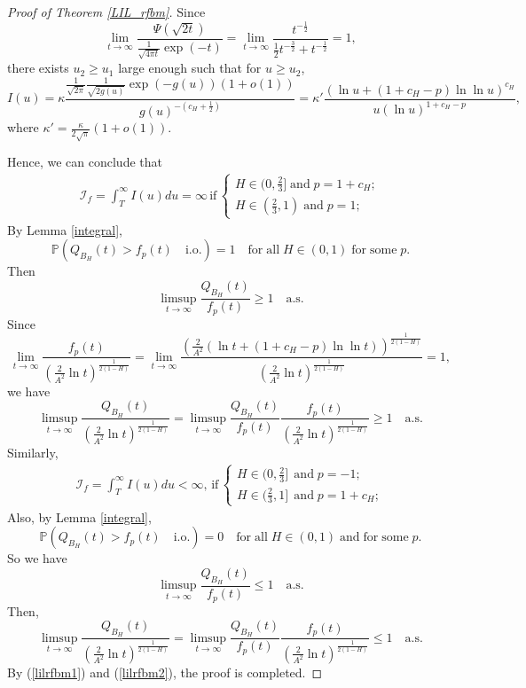 \documentclass[main.tex]{subfiles}
\begin{document}
\begin{proof}[Proof of Theorem \ref{LIL_rfbm}]
Since
$$\lim\limits_{t\to\infty}\frac{\Psi\left(\sqrt{2t}\right)}{\frac{1}{\sqrt{4\pi t}}\exp(-t)}=\lim\limits_{t\to\infty}\frac{t^{-\frac{1}{2}}}{\frac{1}{2}t^{-\frac{3}{2}}+t^{-\frac{1}{2}}}=1,$$
there exists $u_2\geqslant u_1$ large enough such that for $u\geqslant u_2$,
$$I(u)=\kappa\frac{\frac{1}{\sqrt{2\pi}}\frac{1}{\sqrt{2g(u)}}\exp(-g(u))\left(1+o(1)\right)}{g(u)^{-(c_H+\frac{1}{2})}}=\kappa'\frac{\left(\ln{u}+(1+c_H-p)\ln{\ln{u}}\right)^{c_H}}{u(\ln{u})^{1+c_H-p}},$$
where $\kappa'=\frac{\kappa}{2\sqrt{\pi}}(1+o(1))$.

Hence, we can conclude that
\begin{align*}
	\mathcal{I}_f=\int^\infty_TI(u)du=\infty\,\mathrm{if}\,
	\left\{
		\begin{array}{lr}
			H\in(0,\frac{2}{3}]\;\mathrm{and}\;p = 1+c_H;\\
			H\in(\frac{2}{3},1)\;\mathrm{and}\;p = 1;
		\end{array}
	\right.
\end{align*}
By Lemma \ref{integral},
$$\mathbb{P}\left(Q_{B_{H}}(t)>f_p(t)\quad\mathrm{i.o.}\right)=1\quad\mathrm{for\;all\;}H\in(0,1)\mathrm{\;for\;some\;}p.$$
Then 
$$\limsup\limits_{t\to\infty}\frac{Q_{B_{H}}(t)}{f_p(t)}\geqslant1\quad\mathrm{a.s.}$$
Since
$$\lim_{t\to\infty}\frac{f_p(t)}{(\frac{2}{A^{2}}\ln t)^{\frac{1}{2(1-H)}}}=\lim_{t\to\infty}\frac{\left(\frac{2}{A^{2}}(\ln{t} + (1+c_H-p)\ln{\ln{t}})\right)^{\frac{1}{2(1-H)}}}{(\frac{2}{A^{2}}\ln t)^{\frac{1}{2(1-H)}}}=1,$$
we have
\begin{equation}
\label{lilrfbm1}
	\limsup\limits_{t\to\infty}\frac{Q_{B_H}(t)}{(\frac{2}{A^{2}}\ln t)^{\frac{1}{2(1-H)}}}=\limsup\limits_{t\to\infty}\frac{Q_{B_{H}}(t)}{f_p(t)}\frac{f_p(t)}{(\frac{2}{A^{2}}\ln t)^{\frac{1}{2(1-H)}}}\geqslant1\quad\mathrm{a.s.}
\end{equation}
Similarly,
\begin{align*}
	\mathcal{I}_f=\int^\infty_TI(u)du<\infty,\,\mathrm{if}\,
	\left\{
		\begin{array}{lr}
			H\in(0,\frac{2}{3}]\;\mathrm{\,and}\;p = -1;\\
			H\in(\frac{2}{3},1]\;\mathrm{\,and}\;p = 1+c_H;
		\end{array}
	\right.
\end{align*}
Also, by Lemma \ref{integral},
$$\mathbb{P}\left(Q_{B_{H}}(t)>f_p(t)\quad\mathrm{i.o.}\right)=0\quad\mathrm{for\;all\;}H\in(0,1)\mathrm{\;and\;for\;some\;}p.$$
So we have
$$\limsup\limits_{t\to\infty}\frac{Q_{B_{H}}(t)}{f_p(t)}\leqslant1\quad\mathrm{a.s.}$$
Then,
\begin{equation}
\label{lilrfbm2}
	\limsup\limits_{t\to\infty}\frac{Q_{B_{H}}(t)}{(\frac{2}{A^{2}}\ln t)^{\frac{1}{2(1-H)}}}=\limsup\limits_{t\to\infty}\frac{Q_{B_{H}}(t)}{f_p(t)}\frac{f_p(t)}{(\frac{2}{A^{2}}\ln t)^{\frac{1}{2(1-H)}}}\leqslant1\quad\mathrm{a.s.}
\end{equation}
By (\ref{lilrfbm1}) and (\ref{lilrfbm2}), the proof is completed.
\end{proof}
\end{document}
